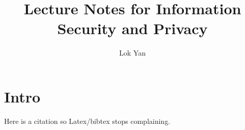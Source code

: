\documentclass[12pt,lettersize]{book}
\title{Lecture Notes for Information Security and Privacy}
\author{Lok Yan}
\begin{document}
\maketitle

\chapter{Intro}
Here is a citation so Latex/bibtex stops complaining. \cite{NYUISP_Notes_Github}








\end{document}
